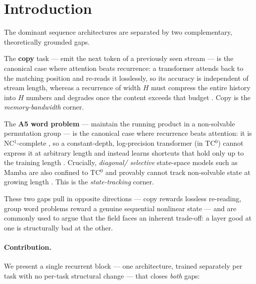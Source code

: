 \documentclass[11pt]{article}
\begin{document}
\section{Introduction}

The dominant sequence architectures are separated by two complementary,
theoretically grounded gaps.

The \textbf{copy} task --- emit the next token of a previously seen stream ---
is the canonical case where attention beats recurrence: a transformer attends
back to the matching position and re-reads it losslessly, so its accuracy is
independent of stream length, whereas a recurrence of width $H$ must compress
the entire history into $H$ numbers and degrades once the content exceeds that
budget \citep{jelassi2024repeat}. Copy is the \emph{memory-bandwidth} corner.

The \textbf{A5 word problem} --- maintain the running product in a
non-solvable permutation group --- is the canonical case where recurrence
beats attention: it is NC$^1$-complete \citep{barrington1989bounded}, so a
constant-depth, log-precision transformer (in TC$^0$) cannot express it at
arbitrary length and instead learns shortcuts that hold only up to the
training length \citep{liu2023transformers}. Crucially, \emph{diagonal/
selective} state-space models such as Mamba \citep{gu2023mamba} are also
confined to TC$^0$ and provably cannot track non-solvable state at growing
length \citep{merrill2024illusion}. This is the \emph{state-tracking} corner.

These two gaps pull in opposite directions --- copy rewards lossless
re-reading, group word problems reward a genuine sequential nonlinear state --- and are
commonly used to argue that the field faces an inherent trade-off: a layer
good at one is structurally bad at the other.

\paragraph{Contribution.} We present a single recurrent block --- one
architecture, trained separately per task with no per-task structural change
--- that closes \emph{both} gaps:
\end{document}
